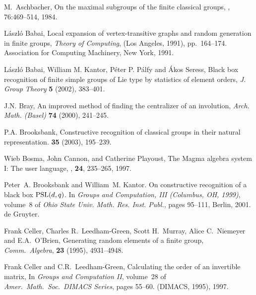 \documentclass[12pt]{article}
\begin{document}
\begin{thebibliography}{10000}

M.\ Aschbacher,
\newblock On the maximal subgroups of the finite classical groups,
, 76:469--514, 1984.

L\'aszl\'o Babai,  
Local expansion of vertex-transitive graphs and
  random generation in finite groups,  {\it Theory of Computing}, (Los
  Angeles, 1991), pp.\ 164--174. Association for Computing Machinery, 
New York, 1991.

L\'aszl\'o Babai, William M. Kantor, P\'{e}ter P. P\'{a}lfy and \'{A}kos 
Seress, Black box recognition of finite simple groups of Lie type by
statistics of element orders, {\it J. Group Theory} {\bf 5} (2002),
383--401.

 J.N. Bray, An improved method of finding
the centralizer of an involution, {\it Arch. Math. (Basel)}
{\bf 74} (2000), 241--245.

P.A. Brooksbank,
\newblock Constructive recognition of classical groups
in their natural representation.
 {\bf 35} (2003), 195--239.

Wieb Bosma, John Cannon, and Catherine Playoust,
\newblock The {\sc Magma} algebra system I: The user language,
, {\bf 24}, 235--265, 1997.

Peter~A. Brooksbank and William~M. Kantor.
\newblock On constructive recognition of a black box {${\rm PSL}(d,q)$}.
\newblock In {\em Groups and Computation, III (Columbus, OH, 1999)}, volume~8
  of {\em Ohio State Univ. Math. Res. Inst. Publ.}, pages 95--111, Berlin,
  2001. de Gruyter.



Frank Celler, Charles R.\ Leedham-Green, Scott H.\ Murray, Alice C.\
  Niemeyer and E.A.\ O'Brien, Generating random elements of a 
finite group, {\it Comm.\ Algebra}, {\bf 23} (1995), 4931--4948.

Frank Celler and C.R.\ Leedham-Green,
\newblock Calculating the order of an invertible matrix,
\newblock In {\em {Groups and Computation {II}}}, volume~28 of {\em Amer.\
  Math.\ Soc.\ DIMACS Series}, pages 55--60. (DIMACS, 1995), 1997.



\end{thebibliography}
\end{document}
